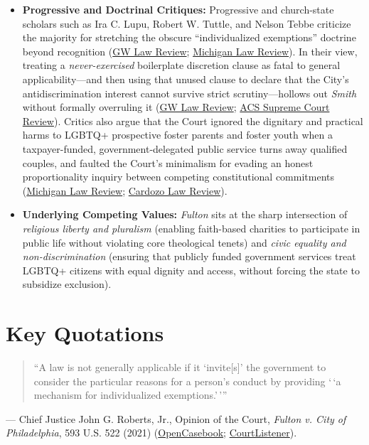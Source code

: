 \documentclass[12pt]{article}
\begin{document}
\begin{itemize}
    \item \textbf{Progressive and Doctrinal Critiques:} Progressive and church-state scholars such as Ira C. Lupu, Robert W. Tuttle, and Nelson Tebbe criticize the majority for stretching the obscure ``individualized exemptions'' doctrine beyond recognition (\href{https://www.gwlr.org/two-surprises-in-fulton-v-city-of-philadelphia/}{GW Law Review}; \href{https://michiganlawreview.org/journal/the-politics-of-proportionality/}{Michigan Law Review}). In their view, treating a \emph{never-exercised} boilerplate discretion clause as fatal to general applicability---and then using that unused clause to declare that the City's antidiscrimination interest cannot survive strict scrutiny---hollows out \textit{Smith} without formally overruling it (\href{https://www.gwlr.org/two-surprises-in-fulton-v-city-of-philadelphia/}{GW Law Review}; \href{https://www.acslaw.org/analysis/acs-journal/2020-2021-acs-supreme-court-review/the-radical-uncertainty-of-free-exercise-principles-a-comment-on-fulton-v-city-of-philadelphia/}{ACS Supreme Court Review}). Critics also argue that the Court ignored the dignitary and practical harms to LGBTQ+ prospective foster parents and foster youth when a taxpayer-funded, government-delegated public service turns away qualified couples, and faulted the Court's minimalism for evading an honest proportionality inquiry between competing constitutional commitments (\href{https://michiganlawreview.org/journal/the-politics-of-proportionality/}{Michigan Law Review}; \href{https://www.cardozolawreview.com/remembering-who-foster-care-is-for-public-accommodation-and-other-misconceptions-and-missed-opportunities-in-fulton-v-city-of-philadelphia/}{Cardozo Law Review}).
    \item \textbf{Underlying Competing Values:} \textit{Fulton} sits at the sharp intersection of \emph{religious liberty and pluralism} (enabling faith-based charities to participate in public life without violating core theological tenets) and \emph{civic equality and non-discrimination} (ensuring that publicly funded government services treat LGBTQ+ citizens with equal dignity and access, without forcing the state to subsidize exclusion).
\end{itemize}

\section{Key Quotations}

\begin{quote}
``A law is not generally applicable if it `invite[s]' the government to consider the particular reasons for a person's conduct by providing `\,`a mechanism for individualized exemptions.'\,'''
\end{quote}
\noindent--- Chief Justice John G. Roberts, Jr., Opinion of the Court, \textit{Fulton v. City of Philadelphia}, 593 U.S. 522 (2021) (\href{https://opencasebook.org/casebooks/4501-constitutional-law/resources/12.9-fulton-v-city-of-philadelphia-2020/}{OpenCasebook}; \href{https://www.courtlistener.com/opinion/4892570/fulton-v-philadelphia/}{CourtListener}).
\end{document}
